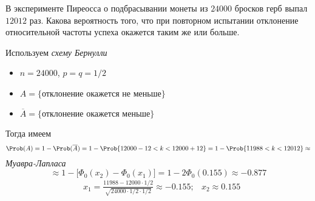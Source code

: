 \begin{exm}
	В эксперименте Пиреосса о подбрасывании монеты из $24000$ бросков герб выпал $12012$ раз. Какова вероятность того, что при повторном испытании отклонение относительной частоты успеха окажется таким же или больше.
\end{exm}

\begin{slv}
	Используем \emph{схему Бернулли}
	\begin{itemize}
		\item $n = 24000$, $p = q = 1/2$
		\item $A = \{ \text{отклонение окажется не меньше} \}$
		\item $\overline{A} = \{ \text{отклонение окажется меньше} \}$
	\end{itemize}
	Тогда имеем 
	\[
		\Prob(A) = 1 - \Prob(\overline{A}) = 1 - \Prob \{12000 - 12 < k < 12000 + 12 \} = 1 - \Prob \{ 11988 < k < 12012 \} \approx 
	\]
	\emph{Муавра-Лапласа}
	\[
		\approx 1 - \bigl[ \Phi_0(x_2) - \Phi_0(x_1) \bigr] = 1 - 2\Phi_0(0.155) \approx -0.877
	\]
	\begin{align*}
	&x_1 = \frac{11988 - 12000 \cdot 1/2}{\sqrt{24000 \cdot 1/2 \cdot 1/2}} \approx -0.155; &x_2 \approx 0.155
	\end{align*}
\end{slv}